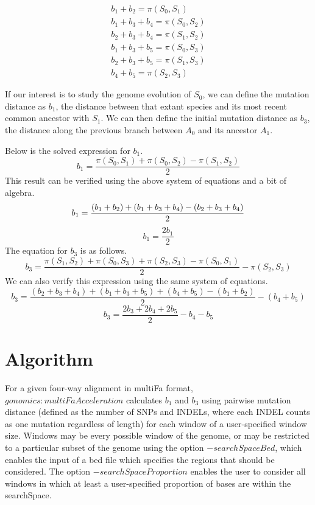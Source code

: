 \documentclass{article} %
\begin{document}
\begin{equation}
\begin{split}
b_1 + b_2 = \pi(S_0, S_1)\\
b_1 + b_3 + b_4 = \pi(S_0, S_2)\\
b_2+b_3+b_4 = \pi(S_1,S_2)\\
b_1+b_3+b_5=\pi(S_0,S_3)\\
b_2+b_3+b_5=\pi(S_1, S_3)\\
b_4+b_5=\pi(S_2, S_3)
\end{split}
\end{equation}

If our interest is to study the genome evolution of $S_0$, we can define the mutation distance as $b_1$, the distance between that extant species and its most recent common ancestor with $S_1$. We can then define the initial mutation distance as $b_3$, the distance along the previous branch between $A_0$ and its ancestor $A_1$.\par
Below is the solved expression for $b_1$.
\begin{equation}
	\boxed{b_1 = \frac{\pi(S_0, S_1) + \pi(S_0, S_2) - \pi(S_1, S_2)}{2}}
\end{equation}
This result can be verified using the above system of equations and a bit of algebra.
\begin{equation*}
	b_1 = \frac{(b_1 + b_2) + (b_1 + b_3 + b_4) - (b_2 + b_3 + b_4)}{2}\\
\end{equation*}
\begin{equation*}
	b_1 = \frac{2b_1}{2}
\end{equation*}
The equation for $b_3$ is as follows.
\begin{equation}
\boxed{b_3 = \frac{\pi(S_1,S_2) + \pi(S_0, S_3) + \pi(S_2, S_3) - \pi(S_0, S_1)}{2} - \pi(S_2, S_3)}
\end{equation}
We can also verify this expression using the same system of equations.
\begin{equation*}
	b_3 = \frac{(b_2 + b_3 + b_4) + (b_1 + b_3 + b_5) + (b_4 + b_5) - (b_1 + b_2)}{2} - (b_4 + b_5)
\end{equation*}
\begin{equation*}
	b_3 = \frac{2b_3 + 2b_4 + 2b_5}{2} - b_4 - b_5
\end{equation*}

\section{Algorithm}
For a given four-way alignment in multiFa format, $gonomics:multiFaAcceleration$ calculates $b_1$ and $b_3$ using pairwise mutation distance (defined as the number of SNPs and INDELs, where each INDEL counts as one mutation regardless of length) for each window of a user-specified window size. Windows may be every possible window of the genome, or may be restricted to a particular subset of the genome using the option $-searchSpaceBed$, which enables the input of a bed file which specifies the regions that should be considered. The option $-searchSpaceProportion$ enables the user to consider all windows in which at least a user-specified proportion of bases are within the searchSpace.
\end{document}
